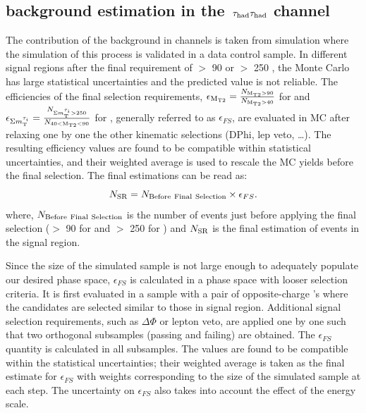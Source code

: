 \subsection{\texorpdfstring{\wjets background estimation in the $\,\tau_{\rm had}\tau_{\rm had}$ channel}{W+jets background estimation in the tau-tau channel}}
\label{sect:bkgW}
The contribution of the \wjets background in \tauTau channels is taken from simulation where the simulation of this process is validated in a data control sample. 
In different signal regions after the final requirement of \mttwo $>$ 90 \GeV or \SumMT $>$ 250 \GeV, 
the \wjets Monte Carlo has large statistical uncertainties and the predicted value is not reliable. 
The efficiencies of the final selection requirements, $\epsilon_{\rm M_{T2}}=\frac{N_{\rm M_{T2}>90}}{N_{\rm M_{T2}>40}}$ for  \binone and $\epsilon_{\Sigma m_{\rm T}^{\tau_i}}=\frac{N_{\Sigma m_{\rm T}^{\tau_i}>250}}{N_{40<\rm M_{T2}<90}}$ for \bintwo, generally referred to as $\epsilon_{FS}$, are evaluated in MC after relaxing one by one the other kinematic selections (DPhi, lep veto, …). The resulting efficiency values are found to be compatible within statistical uncertainties, and their weighted average is used to rescale the MC yields before the final selection.
The final estimations can be read as:
\begin{equation}
N_{\rm SR} = N_{\rm Before~Final~Selection} \times \epsilon_{FS}.
\end{equation}
where, $N_{\rm Before~Final~Selection}$ is the number of \wjets events just before applying the final selection 
(\mttwo $>$ 90 \GeV for \binone and \SumMT $>$ 250 \GeV for \bintwo) and $N_{\rm SR}$ is the final estimation of \wjets events in the signal region.

Since the size of the simulated \wjets sample is not large enough to adequately populate our desired phase space, %
$\epsilon_{FS}$ is calculated in a phase space with looser selection criteria. It is first evaluated in a \wjets sample with a pair of opposite-charge \Tau's where the \Tau candidates are selected similar to those in signal region. 
Additional signal selection requirements, such as $\Delta \Phi$ or lepton veto, are applied one by one such that two orthogonal subsamples (passing and failing) are obtained. The $\epsilon_{FS}$ quantity is calculated in all subsamples. The values are found to be compatible within the statistical uncertainties; their weighted average is taken as the final estimate for $\epsilon_{FS}$ with weights corresponding to the size of the simulated sample at each step. %
The uncertainty on $\epsilon_{FS}$  also takes into account the effect of the \Tau energy scale.


